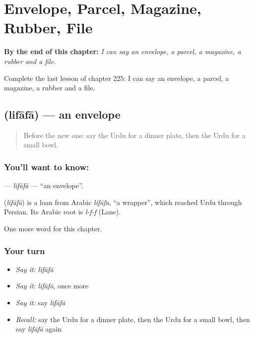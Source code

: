 
\chapter{Envelope, Parcel, Magazine, Rubber, File}
\label{ch:ur-envelope-parcel-magazine-rubber-file}

\begin{chapteropening}
\textbf{By the end of this chapter:} \emph{I can say an envelope, a parcel, a magazine, a rubber and a file.}

Complete the last lesson of chapter 225: I can say an envelope, a parcel, a magazine, a rubber and a file.
\end{chapteropening}

\section[\texorpdfstring{\ur{لفافہ} (lifāfā)}{لفافہ (lifāfā)}]{ (lifāfā) — an envelope}

\label{lesson:UR-C225-lifafa}



\begin{quote}
Before the new one: say the Urdu for a dinner plate, then the Urdu for a small bowl.
\end{quote}

\subsection*{You'll want to know: }
\textbf{} — \emph{lifāfā} — \textquotedblleft{}an envelope\textquotedblright{}.

\begin{cousinweb}
\textbf{} (\emph{lifāfā}) is a loan from Arabic \emph{lifāfa}, \textquotedblleft{}a wrapper\textquotedblright{}, which reached Urdu through Persian. Its Arabic root is \emph{l-f-f} (Lane).
\end{cousinweb}

\begin{grammarlens}[title={What you've built}]
One more word for this chapter.
\end{grammarlens}

\subsection*{Your turn}
\begin{itemize}
\raggedright
  \item \emph{Say it:} \emph{lifāfā}
  \item \emph{Say it:} \emph{lifāfā}, once more
  \item \emph{Say it:} say \emph{lifāfā}
  \item \emph{Recall:} say the Urdu for a dinner plate, then the Urdu for a small bowl, then say \emph{lifāfā} again
\end{itemize}

